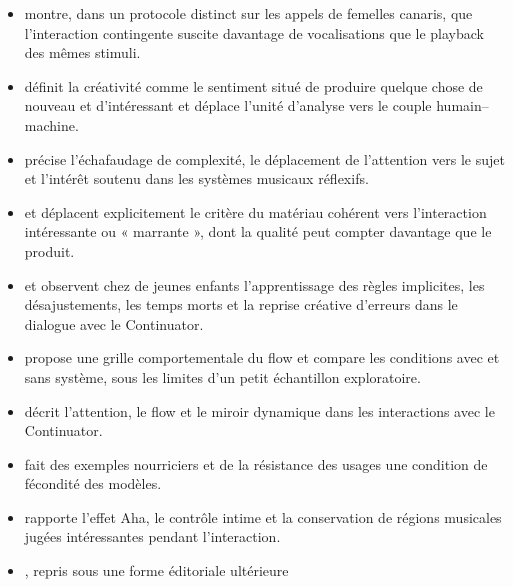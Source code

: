 \documentclass[11pt,a4paper]{article}
\begin{document}
\begin{itemize}
        établissent les limites de la prédiction de popularité et reconstruisent
        la cible comme produit conjoint de la forme, de l'exposition et de
        l'influence sociale ; le chapitre discute aussi le cas des trilles
        artificiellement difficiles chez les canaris.
  \item \textcite{lerch2011closedloop} montre, dans un protocole distinct sur les
        appels de femelles canaris, que l'interaction contingente suscite davantage
        de vocalisations que le playback des mêmes stimuli.
  \item \textcite{pachet2006creativity} définit la créativité comme le sentiment
        situé de produire quelque chose de nouveau et d'intéressant et déplace
        l'unité d'analyse vers le couple humain--machine.
  \item \textcite{pachet2006reflective} précise l'échafaudage de complexité, le
        déplacement de l'attention vers le sujet et l'intérêt soutenu dans les
        systèmes musicaux réflexifs.
  \item \textcite{pachet2004cybernetic} et
        \textcite{pachet2006interactionsreflexives} déplacent explicitement le
        critère du matériau cohérent vers l'interaction intéressante ou
        « marrante », dont la qualité peut compter davantage que le produit.
  \item \textcite{pachet2004childrenreflect} et
        \textcite{addessi2005experiments} observent chez de jeunes enfants
        l'apprentissage des règles implicites, les désajustements, les temps morts
        et la reprise créative d'erreurs dans le dialogue avec le Continuator.
  \item \textcite{addessi2006flowmachine} propose une grille comportementale du
        flow et compare les conditions avec et sans système, sous les limites d'un
        petit échantillon exploratoire.
  \item \textcite{pachet2004flowmachines} décrit l'attention, le flow et le miroir
        dynamique dans les interactions avec le Continuator.
  \item \textcite{pachet2004reification} fait des exemples nourriciers et de la
        résistance des usages une condition de fécondité des modèles.
  \item \textcite{pachet2002continuatorinteraction} rapporte l'effet Aha, le
        contrôle intime et la conservation de régions musicales jugées
        intéressantes pendant l'interaction.
  \item \textcite{pachet2000melodie}, repris sous une forme éditoriale ultérieure

\end{itemize}
\end{document}
